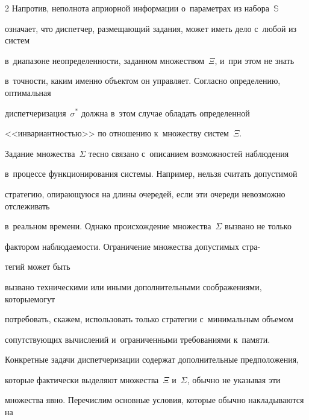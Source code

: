 \begin{multicols}{2}
Напротив, неполнота априорной информации о~параметрах из набора~$\mathbb{S}$ 


означает, что диспетчер, раз\-ме\-ща\-ющий задания, может иметь дело с~любой из систем 


в~диапазоне неопределенности, заданном множеством~$\Xi$, и~при этом не знать 


в~точности, каким именно объектом он управляет. Согласно определению, оптимальная 


диспетчеризация~$\sigma^*$ должна в~этом случае обладать определенной 


<<инвариантностью>> по отношению к~множеству систем~$\Xi$.


    


    Задание множества~$\Sigma$ тесно связано с~описанием возможностей наблюдения 


в~процессе функционирования системы. Например, нельзя считать до\-пус\-ти\-мой 


стратегию, опирающуюся на длины очередей, если эти очереди невозможно отслеживать 


в~реальном времени. Однако происхождение множества~$\Sigma$ вызвано не только 


фактором наблюда\-емости. Ограничение множества допустимых стра-\linebreak\vspace*{-12pt}





\pagebreak





\noindent


тегий может быть 


вызвано техническими или иными дополнительными соображениями, которые\linebreak могут 


потребовать, скажем, использовать только стратегии с~минимальным объемом 


сопутствующих вычислений и~ограниченными требованиями к~памяти.


    


    Конкретные задачи диспетчеризации содержат дополнительные предположения, 


которые фактически выделяют множества~$\Xi$ и~$\Sigma$, обычно не указывая эти 


множества явно. Перечислим основные условия, которые обычно накладываются на 



\end{multicols}
